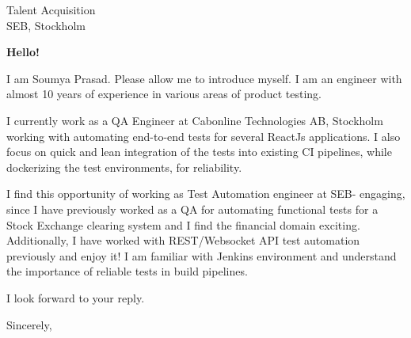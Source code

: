 \documentclass[10pt]{letter} %
\begin{document}

\begin{letter}{Talent Acquisition \\ SEB, Stockholm} %


\opening{\textbf{Hello!}}
I am Soumya Prasad. Please allow me to introduce myself.  
I am an engineer with almost 10 years of experience in various
areas of product testing.

\hfill \break
I currently work as a QA Engineer at Cabonline Technologies AB, Stockholm
working with automating end-to-end tests for several ReactJs applications.
I also focus on quick and lean integration of the tests into existing
CI pipelines, while dockerizing the test environments, for reliability.

\hfill \break
I find this opportunity of working as Test Automation engineer at SEB- engaging, since I have
previously worked as a QA for automating functional tests for a Stock Exchange 
clearing system and I find the financial domain exciting. Additionally, I have worked with REST/Websocket 
API test automation previously and enjoy it! I am familiar with Jenkins environment and 
understand the importance of reliable tests in build pipelines. 


I look forward to your reply.

\vspace{2\parskip} %
\closing{Sincerely,}
\vspace{2\parskip} %




\end{letter}
 
\end{document}
